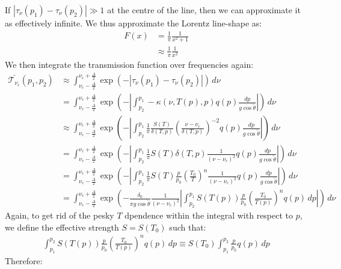 If $|\tau_\nu(p_1)-\tau_\nu(p_2)|\gg 1$ at the centre of the line, then we can approximate it as effectively infinite. We thus approximate the Lorentz line-shape as:
\begin{align*}
    F(x)&=\frac{1}{\pi}\frac{1}{x^2+1}\\
    &\approx \frac{1}{\pi}\frac{1}{x^2}
\end{align*}
We then integrate the transmission function over frequencies again:
\begin{align*}
    \bar{\mathcal{T}_{\nu_c}}(p_1,p_2)&\approx\int_{\nu_c-\frac{\Delta}{2}}^{\nu_c+\frac{\Delta}{2}} \exp(-|\tau_\nu(p_1)-\tau_\nu(p_2)|)\,d\nu\\
    &=\int_{\nu_c-\frac{\Delta}{2}}^{\nu_c+\frac{\Delta}{2}} \exp\left(
        -\left|
            \int_{p_2}^{p_1}-\kappa(\nu,T(p),p)q(p)\frac{dp}{g\cos\tilde{\theta}}
        \right|
    \right)\,d\nu\\
    &\approx\int_{\nu_c-\frac{\Delta}{2}}^{\nu_c+\frac{\Delta}{2}} \exp\left(
        -\left|
            \int_{p_2}^{p_1}\frac{1}{\pi}\frac{S(T)}{\delta(T,p)}\left( \frac{\nu-\nu_c}{\delta(T,p)} \right)^{-2}q(p)\frac{dp}{g\cos\tilde{\theta}}
        \right|
    \right)\,d\nu\\
    &=\int_{\nu_c-\frac{\Delta}{2}}^{\nu_c+\frac{\Delta}{2}} \exp\left(
        -\left|
            \int_{p_2}^{p_1}\frac{1}{\pi}S(T)\delta(T,p) \frac{1}{(\nu-\nu_c)^2}q(p)\frac{dp}{g\cos\tilde{\theta}}
        \right|
    \right)\,d\nu\\
    &=\int_{\nu_c-\frac{\Delta}{2}}^{\nu_c+\frac{\Delta}{2}} \exp\left(
        -\left|
            \int_{p_2}^{p_1}\frac{1}{\pi}S(T) \frac{p}{p_0} \left( \frac{T_0}{T} \right)^n \frac{1}{(\nu-\nu_c)^2}q(p)\frac{dp}{g\cos\tilde{\theta}}
        \right|
    \right)\,d\nu\\
    &=\int_{\nu_c-\frac{\Delta}{2}}^{\nu_c+\frac{\Delta}{2}} \exp\left(
        -\frac{\delta_0}{\pi g \cos \tilde{\theta}}\frac{1}{(\nu-\nu_c)^2}
        \left|
            \int_{p_2}^{p_1}S(T(p))\frac{p}{p_0} \left( \frac{T_0}{T(p)} \right)^n q(p)\,dp
        \right|
    \right)\,d\nu
\end{align*}
Again, to get rid of the pesky $T$ dpendence within the integral with respect to $p$, we define the effective strength $S=S(T_0)$ such that:
\begin{align*}
    \int_{p_1}^{p_2}S(T(p))\frac{p}{p_0} \left( \frac{T_0}{T(p)} \right)^nq(p)\,dp\equiv
    S(T_0)\int_{p_1}^{p_2}\frac{p}{p_0} q(p)\,dp
\end{align*}
Therefore:

